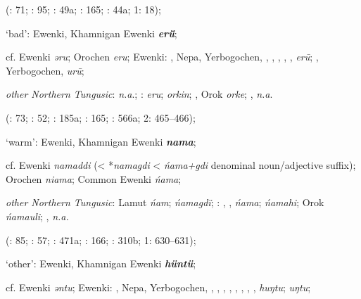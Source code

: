 \documentclass[output=paper,colorlinks,citecolor=brown]{langscibook}
\begin{document}
\begin{xlist}
\begin{xlist}
    (\citealt{Castrén1856}: 71; \citealt{Janhunen1991}: 95; \citealt{Dorji1998}: 49a; \citealt{Chaoke2014a}: 165; \citealt{Vasilevic1958}: 44a; \citealt{Cincius1975B} 1: 18);

    \ex ‘bad’:  Ewenki, Khamnigan Ewenki \textbf{\textit{erǖ}};

    cf.  Ewenki \textit{ǝru}; Orochen \textit{eru};  Ewenki: , Nepa, Yerbogochen, , , , , ,  \textit{erū}; , Yerbogochen,  \textit{urū};

    \textit{other Northern Tungusic}: \textit{n.a}.; \textit{}:  \textit{eru};  \textit{orkin}; , Orok \textit{orke}; ,  \textit{n.a}.
    
    (\citealt{Castrén1856}: 73; \citealt{Janhunen1991}: 52; \citealt{Dorji1998}: 185a; \citealt{Chaoke2014a}: 165; \citealt{Vasilevic1958}: 566a; \citealt{Cincius1975B} 2: 465--466);

    \ex ‘warm’:  Ewenki, Khamnigan Ewenki \textbf{\textit{nama}};

    cf.  Ewenki \textit{namaddi} (< *\textit{namagdi} < \textit{ńama+gdi}  denominal noun/adjective suffix); Orochen \textit{niama};  Common Ewenki \textit{ńama};

    \textit{other Northern Tungusic}: Lamut \textit{ńam};  \textit{ńamagdï}; \textit{}: , ,  \textit{ńama};  \textit{ńamahi}; Orok \textit{ńamauli}; ,  \textit{n.a.}
    
    (\citealt{Castrén1856}: 85; \citealt{Janhunen1991}: 57; \citealt{Dorji1998}: 471a; \citealt{Chaoke2014a}: 166; \citealt{Vasilevic1958}: 310b; \citealt{Cincius1975B} 1: 630--631);

    \ex ‘other’:  Ewenki, Khamnigan Ewenki \textbf{\textit{hüntü}};

    cf.  Ewenki \textit{ǝntu};  Ewenki: , Nepa, Yerbogochen, , , , , , , , ,  \textit{huŋtu};  \textit{uŋtu};


\end{xlist}
\end{xlist}
\end{document}
